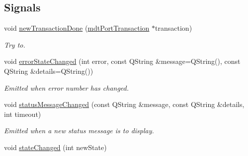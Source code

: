 \subsection*{Signals}
\begin{DoxyCompactItemize}
\item 
void \hyperlink{classmdt_port_manager_a416a24db1048e9f66aef27ea810954d2}{newTransactionDone} (\hyperlink{classmdt_port_transaction}{mdtPortTransaction} $\ast$transaction)
\begin{DoxyCompactList}\small\item\em Try to. \end{DoxyCompactList}\item 
void \hyperlink{classmdt_port_manager_a7f9437d084e136d8d265dace7431395f}{errorStateChanged} (int error, const QString \&message=QString(), const QString \&details=QString())
\begin{DoxyCompactList}\small\item\em Emitted when error number has changed. \end{DoxyCompactList}\item 
void \hyperlink{classmdt_port_manager_a6f6c6f8a8430d8631a08c765565db9ab}{statusMessageChanged} (const QString \&message, const QString \&details, int timeout)
\begin{DoxyCompactList}\small\item\em Emitted when a new status message is to display. \end{DoxyCompactList}\item 
\hypertarget{classmdt_port_manager_a1c9e1848373831962b7ec83fd4fe5d35}{
void \hyperlink{classmdt_port_manager_a1c9e1848373831962b7ec83fd4fe5d35}{stateChanged} (int newState)}
\label{classmdt_port_manager_a1c9e1848373831962b7ec83fd4fe5d35}


\end{DoxyCompactItemize}
